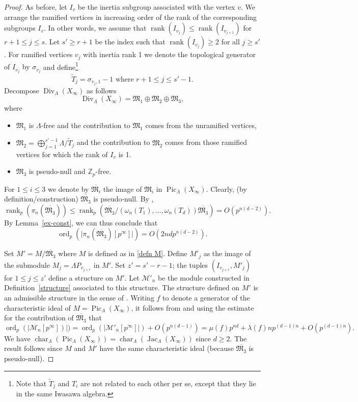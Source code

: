 \documentclass{amsart}
\numberwithin{equation}{section}
\theoremstyle{remark}
\newcommand{\Div}{\operatorname{Div}}
\newcommand{\Jac}{\operatorname{Jac}}
\newcommand{\Pic}{\operatorname{Pic}}
\newcommand{\ord}{\operatorname{ord}}
\newcommand{\Char}{\operatorname{char}}
\newcommand{\rk}{\operatorname{rank}}
\newcommand{\Z}{\mathbb{Z}}
\theoremstyle{plain} %
\begin{document}
\begin{proof}
{As before, let $I_v$ be the inertia subgroup associated with the vertex $v$.}
We arrange the ramified vertices in increasing order of the rank of the corresponding subgroups $I_v$.
In other words, we assume that $\rk(I_{v_j})\le \rk(I_{v_{j+1}})$ for $r+1\le j\le s$.
Let $s'\ge r+1$ be the index such that $\rk(I_{v_{{j}}})\ge 2$ for all $j\ge s'$.
For {ramified vertices $v_j$ with inertia rank 1 we denote the topological generator of $I_{v_j}$ by $\sigma_{v_j}$} and define\footnote{Note that $\widetilde{T}_j$ and $T_i$ are not related to each other per se, except that they lie in the same Iwasawa algebra.}
\[
\widetilde{T}_{{j}}=\sigma_{v_{{j}},1}-1  \text{ where } r+1\le {j} \le s'-1.
\]
Decompose $\Div_\Lambda(X_\infty)$ as follows
\[
\Div_\Lambda(X_\infty)=\mathfrak{M}_1\oplus \mathfrak{M}_2\oplus \mathfrak{M}_3,
\]
where 
\begin{itemize}
\item $\mathfrak{M}_1$ is $\Lambda$-free and the contribution to $\mathfrak{M}_1$ comes from the unramified vertices,
\item $\mathfrak{M}_2= \displaystyle\bigoplus_{j=1}^{s'-1}\Lambda/\widetilde{T}_j$ and the contribution to $\mathfrak{M}_2$ comes from those ramified vertices for which the rank of $I_v$ is 1. 
\item $\mathfrak{M}_3$ is pseudo-null and $\Z_p$-free.
\end{itemize}
For $1\le i\le 3$ we denote by $\overline{\mathfrak{M}_i}$ the image of $\mathfrak{M}_i$ in $\Pic_\Lambda(X_\infty)$.
Clearly, (by definition/construction) $\overline{\mathfrak{M}_3}$ is pseudo-null.
By \cite[Lemma~3.1]{cuoco-monsky}, 
\[
\rk_p(\pi_n(\overline{\mathfrak{M}_3}))\le \rk_p(\overline{\mathfrak{M}_3}/(\omega_n(T_1),\dots,\omega_n(T_d))\mathfrak{\overline{M_3}})=O(p^{n(d-2)}).
\]
By Lemma~\ref{ex-const}, we can thus conclude that
\[
\ord_p(\vert \pi_n(\overline{\mathfrak{M}_3})[p^\infty]\vert )=O(2nd p^{n(d-2)}).
\]

Set $M'=M/\overline{\mathfrak{M}_3}$ where $M$ is defined as in \eqref{defn M}.
Define $M'_j$ as the image of the submodule $M_j = {\Lambda P_{v_{j+r}}}$ in $M'$.
Set $z'=s'-r-1$; the tuples $(I_{v_{j+r}}, M'_j)$ for $1\le j\le z'$ define a structure on $M'$.
Let $\mathcal{M}'_n$ be the module constructed in Definition~\ref{structure} associated to this structure.
The structure defined on $M'$ is an admissible structure in the sense of \cite[Definitions~4.1 and 4.6]{cuoco-monsky}.
{Writing $f$ to denote a generator of the characteristic ideal of $M = \Pic_{\Lambda}(X_\infty)$, it follows from}
\cite[Theorems~4.12 and 4.13]{cuoco-monsky} and using the estimate for the contribution of $\overline{\mathfrak{M}_3}$ that
\[
\ord_p(\vert \mathcal{M}_n[p^\infty])\vert)=\ord_p(\vert \mathcal{M}'_n[p^\infty]\vert )+O(p^{n(d-1)})=\mu {(f)} p^{nd}+\lambda {(f)} np^{(d-1)n}+O(p^{(d-1)n}).
\]
{We have $\Char_{\Lambda}(\Pic_{\Lambda}(X_\infty)) = \Char_{\Lambda}(\Jac_{\Lambda}(X_\infty))$ since $d\geq 2$.}
The result follows since $M$ and $M'$ have the same characteristic ideal {(because $\overline{\mathfrak{M}_3}$ is pseudo-null)}.
\end{proof}
\end{document}
